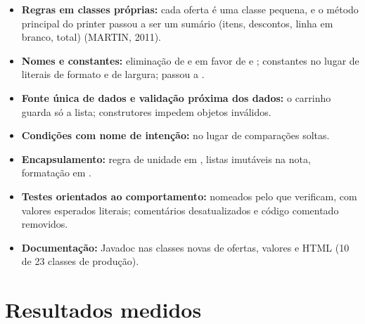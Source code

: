 \begin{itemize}
\item \textbf{Regras em classes próprias:} cada oferta é uma classe pequena, e o método principal do printer passou a ser um sumário (itens, descontos, linha em branco, total) (MARTIN, 2011).
\item \textbf{Nomes e constantes:} eliminação de  e  em favor de  e ; constantes no lugar de literais de formato e de largura;  passou a .
\item \textbf{Fonte única de dados e validação próxima dos dados:} o carrinho guarda só a lista; construtores impedem objetos inválidos.
\item \textbf{Condições com nome de intenção:}  no lugar de comparações soltas.
\item \textbf{Encapsulamento:} regra de unidade em , listas imutáveis na nota, formatação em .
\item \textbf{Testes orientados ao comportamento:} nomeados pelo que verificam, com valores esperados literais; comentários desatualizados e código comentado removidos.
\item \textbf{Documentação:} Javadoc nas classes novas de ofertas, valores e HTML (10 de 23 classes de produção).
\end{itemize}

\section{Resultados medidos}

